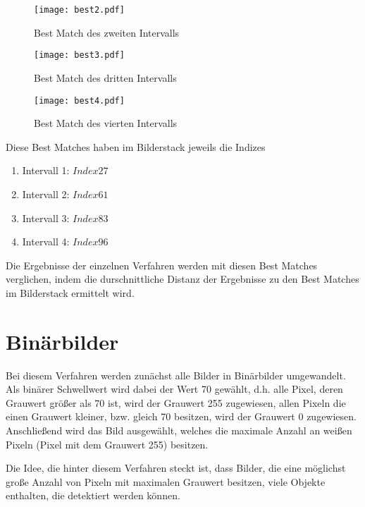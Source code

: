 \begin{figure}[H]
  \begin{center}
    \texttt{[image: best2.pdf]}
    \caption{Best Match des zweiten Intervalls}
    \label{fig:bestmatch2}
  \end{center}
\end{figure}

\begin{figure}[H]
  \begin{center}
    \texttt{[image: best3.pdf]}
    \caption{Best Match des dritten Intervalls}
    \label{fig:bestmatch3}
  \end{center}
\end{figure}

\begin{figure}[H]
  \begin{center}
    \texttt{[image: best4.pdf]}
    \caption{Best Match des vierten Intervalls}
    \label{fig:bestmatch4}
  \end{center}
\end{figure}

Diese Best Matches haben im Bilderstack jeweils die Indizes
\begin{enumerate}
	\item{Intervall 1: $Index 27$}
	\item{Intervall 2: $Index 61$}
	\item{Intervall 3: $Index 83$}
	\item{Intervall 4: $Index 96$}
\end{enumerate}

Die Ergebnisse der einzelnen Verfahren werden mit diesen Best Matches verglichen, indem die durschnittliche Distanz der Ergebnisse zu den Best Matches im Bilderstack ermittelt wird. 

\section{Binärbilder}
Bei diesem Verfahren werden zunächst alle Bilder in Binärbilder umgewandelt. Als binärer Schwellwert wird dabei der Wert 70 gewählt, d.h. alle Pixel, deren Grauwert größer als 70 ist, wird der Grauwert 255 zugewiesen, allen Pixeln die einen Grauwert kleiner, bzw. gleich 70 besitzen, wird der Grauwert 0 zugewiesen. Anschließend wird das Bild ausgewählt, welches die maximale Anzahl an weißen Pixeln (Pixel mit dem Grauwert 255) besitzen.

Die Idee, die hinter diesem Verfahren steckt ist, dass Bilder, die eine möglichst große Anzahl von Pixeln mit maximalen Grauwert besitzen, viele Objekte enthalten, die detektiert werden können. \\

